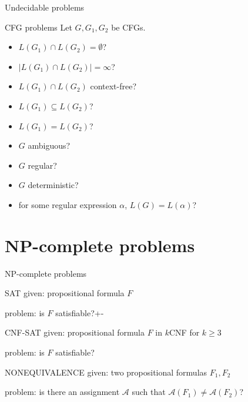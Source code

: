\documentclass{beamer}
\theoremstyle{definition}
\begin{document}
\begin{frame}{Undecidable problems}

\begin{block}{CFG problems}
Let $G, G_1, G_2$ be CFGs.
\begin{itemize}
    \item $L(G_1) \cap L(G_2) = \emptyset$?\pause
    \item $|L(G_1) \cap L(G_2)| = \infty$?\pause
    \item $L(G_1) \cap L(G_2)$ context-free?\pause
    \item $L(G_1) \subseteq L(G_2)$?\pause
    \item $L(G_1) = L(G_2)$?\pause
    \item $G$ ambiguous?\pause
    \item $G$ regular?\pause
    \item $G$ deterministic?\pause
    \item for some regular expression $\alpha$, $L(G) = L(\alpha)$?
\end{itemize}
\end{block}

\end{frame}

\section{NP-complete problems}

\begin{frame}{NP-complete problems}

\begin{block}{SAT}
given: propositional formula $F$\par
problem: is $F$ satisfiable?+-
\end{block}\pause

\begin{block}{CNF-SAT}
given: propositional formula $F$ in $k$CNF for $k \geq 3$\par
problem: is $F$ satisfiable?
\end{block}\pause

\begin{block}{NONEQUIVALENCE}
given: two propositional formulas $F_1, F_2$\par
problem: is there an assignment $\mathcal{A}$ such that $\mathcal{A}(F_1) \neq \mathcal{A}(F_2)$?
\end{block}

\end{frame}
\end{document}
